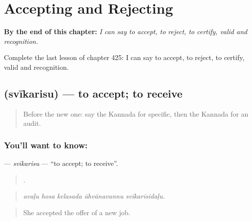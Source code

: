 
\chapter{Accepting and Rejecting}
\label{ch:ka-accepting-and-rejecting}

\begin{chapteropening}
\textbf{By the end of this chapter:} \emph{I can say to accept, to reject, to certify, valid and recognition.}

Complete the last lesson of chapter 425: I can say to accept, to reject, to certify, valid and recognition.
\end{chapteropening}

\section[\texorpdfstring{\kn{ಸ್ವೀಕರಿಸು} (svīkarisu)}{ಸ್ವೀಕರಿಸು (svīkarisu)}]{ (svīkarisu) — to accept; to receive}

\label{lesson:KA-C425-svikarisu}



\begin{quote}
Before the new one: say the Kannada for specific, then the Kannada for an audit.
\end{quote}

\subsection*{You'll want to know: }
\textbf{} — \emph{svīkarisu} — \textquotedblleft{}to accept; to receive\textquotedblright{}.

\begin{quote}
    .
\end{quote}

\begin{quote}
\emph{avaḷu hosa kelasada āhvānavannu svīkarisidaḷu.}
\end{quote}

\begin{quote}
She accepted the offer of a new job.
\end{quote}

